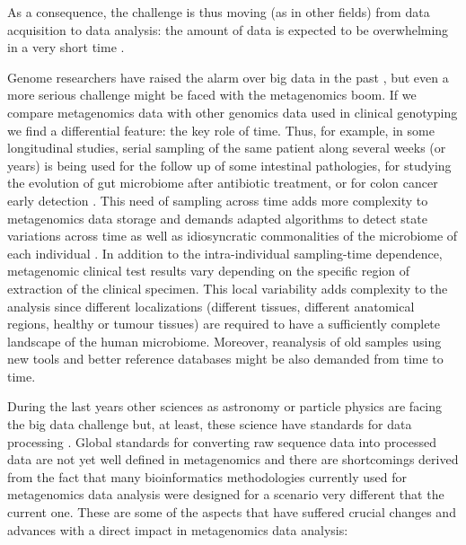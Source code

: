 \documentclass{frontiersSCNS} %
\begin{document}
As a consequence, the challenge is thus moving (as in other fields) from
data acquisition to data analysis: the amount of data is expected to be
overwhelming in a very short time \citep{stephens2015big}.

Genome researchers have raised the alarm over big data in the past
\citep{hayden2015genome}, but even a more serious challenge might be
faced with the metagenomics boom. If we compare metagenomics data with
other genomics data used in clinical genotyping we find a differential
feature: the key role of time. Thus, for example, in some longitudinal
studies, serial sampling of the same patient along several weeks (or
years) is being used for the follow up of some intestinal pathologies,
for studying the evolution of gut microbiome after antibiotic treatment,
or for colon cancer early detection \citep{zeller2014potential}. This
need of sampling across time adds more complexity to metagenomics data
storage and demands adapted algorithms to detect state variations across
time as well as idiosyncratic commonalities of the microbiome of each
individual \citep{franzosa2015identifying}. In addition to the
intra-individual sampling-time dependence, metagenomic clinical test
results vary depending on the specific region of extraction of the
clinical specimen. This local variability adds complexity to the
analysis since different localizations (different tissues, different
anatomical regions, healthy or tumour tissues) are required to have a
sufficiently complete landscape of the human microbiome. Moreover,
reanalysis of old samples using new tools and better reference databases
might be also demanded from time to time.

During the last years other sciences as astronomy or particle physics
are facing the big data challenge but, at least, these science have
standards for data processing \citep{stephens2015big}. Global standards
for converting raw sequence data into processed data are not yet well
defined in metagenomics and there are shortcomings derived from the fact
that many bioinformatics methodologies currently used for metagenomics
data analysis were designed for a scenario very different that the
current one. These are some of the aspects that have suffered crucial
changes and advances with a direct impact in metagenomics data analysis:
\end{document}

